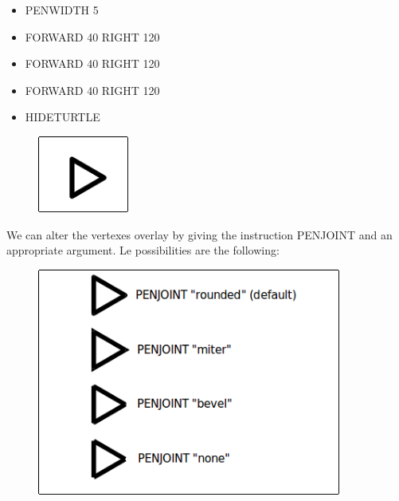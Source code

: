 \vskip 1cm

\begin{scriptsize}
\begin{minipage}{0.40\textwidth}
\begin{itemize}[itemsep=-3pt,parsep=2pt]
\item[] PENWIDTH 5           
\item[] FORWARD 40 RIGHT 120
\item[] FORWARD 40 RIGHT 120
\item[] FORWARD 40 RIGHT 120
\item[] HIDETURTLE
\end{itemize}
\end{minipage}
\end{scriptsize}
\begin{minipage}{0.4\textwidth}
\begin{figure}[H]
   \includegraphics[width=3.0cm,trim=4 4 8 4,clip]{./images/disegnare/disegnare-34.png}
   \label{dis-34}
\end{figure}
\end{minipage} \hfill

\vskip 1cm

We can alter the vertexes overlay by giving the instruction PENJOINT and an appropriate argument. Le possibilities are the following:

\vskip 1cm

\begin{figure}[H]
   \centering
   \includegraphics[width=10.0cm,trim=8 8 8 8,clip]{./images/disegnare/disegnare-35.png}
   \label{dis-35}
\end{figure}

